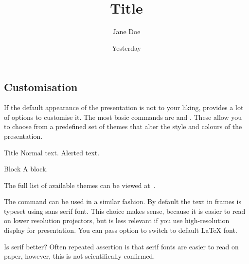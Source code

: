 \subsection{Customisation}

If the default appearance of the presentation is not to your liking,
 provides a lot of options to customise it. The most basic commands
are  and . These allow you to choose from a
predefined set of themes that alter the style and colours of the presentation.

\begin{example}
\author{Jane Doe}
\title{Title}
\date{Yesterday}

\begin{frame}{Title}
  Normal text.
  \alert{Alerted text}.
  \begin{block}{Block}
    A block.
  \end{block}
\end{frame}
\end{example}
The full list of available themes can be viewed
at~\cite{AnotherBeamerThemeMatrix}.

The  command can be used in a similar fashion. By default the
text in frames is typeset using sans serif font. This choice makes sense,
because it is easier to read on lower resolution projectors, but is less
relevant if you use high-resolution display for presentation. You can pass
 option to switch to default \LaTeX{} font.
\begin{example}

\begin{frame}{Is serif better?}
  Often repeated assertion is
  that serif fonts are easier
  to read on paper, however, 
  this is not scientifically
  confirmed.
\end{frame}
\end{example}


